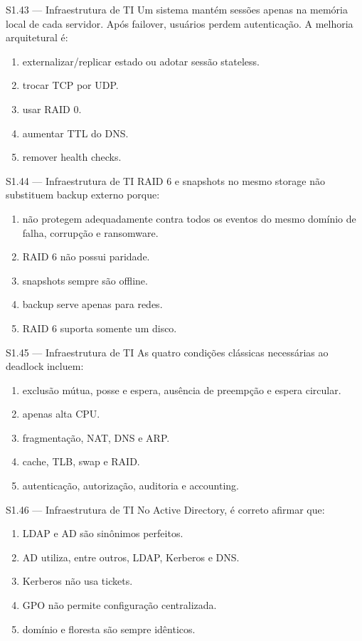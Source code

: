 \begin{questao}{S1.43 — Infraestrutura de TI}
Um sistema mantém sessões apenas na memória local de cada servidor. Após failover, usuários perdem autenticação. A melhoria arquitetural é:
\begin{enumerate}[label=\Alph*)]\item externalizar/replicar estado ou adotar sessão stateless.\item trocar TCP por UDP.\item usar RAID 0.\item aumentar TTL do DNS.\item remover health checks.\end{enumerate}
\end{questao}

\begin{questao}{S1.44 — Infraestrutura de TI}
RAID 6 e snapshots no mesmo storage não substituem backup externo porque:
\begin{enumerate}[label=\Alph*)]\item não protegem adequadamente contra todos os eventos do mesmo domínio de falha, corrupção e ransomware.\item RAID 6 não possui paridade.\item snapshots sempre são offline.\item backup serve apenas para redes.\item RAID 6 suporta somente um disco.\end{enumerate}
\end{questao}

\begin{questao}{S1.45 — Infraestrutura de TI}
As quatro condições clássicas necessárias ao deadlock incluem:
\begin{enumerate}[label=\Alph*)]\item exclusão mútua, posse e espera, ausência de preempção e espera circular.\item apenas alta CPU.\item fragmentação, NAT, DNS e ARP.\item cache, TLB, swap e RAID.\item autenticação, autorização, auditoria e accounting.\end{enumerate}
\end{questao}

\begin{questao}{S1.46 — Infraestrutura de TI}
No Active Directory, é correto afirmar que:
\begin{enumerate}[label=\Alph*)]\item LDAP e AD são sinônimos perfeitos.\item AD utiliza, entre outros, LDAP, Kerberos e DNS.\item Kerberos não usa tickets.\item GPO não permite configuração centralizada.\item domínio e floresta são sempre idênticos.\end{enumerate}
\end{questao}

